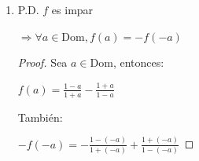 \documentclass{article}
\begin{document}
\begin{enumerate}
\begin{enumerate}
\begin{enumerate}
                \(\Rightarrow \neg(\forall a \in \text{Dom}, f(a) = f(-a))\)
                
                \(\Rightarrow \exists a \in \text{Dom}\) tal que \(f(a) \neq f(-a)\)
                
                \begin{proof} Sea \(a = 2\), entonces:
                
                \(f(a) = f(2)\)
                
                \(f(a) = \frac{{1-2}}{{1+2}} - \frac{{1+2}}{{1-2}}\)
                
                \(f(a) = -\frac{1}{3} + 3\)
                
                \(f(a) = \frac{8}{3}\)
                \vspace{\baselineskip}
                
                También:
                
                \(f(-a) = f(-2)\)
                
                \(f(-a) = \frac{{1-(-2)}}{{1+(-2)}} - \frac{{1+(-2)}}{{1-(-2)}}\)
                
                \(f(-a) = -3 + \frac{1}{3}\)
                
                \(f(-a) = -\frac{8}{3}\)
                \vspace{\baselineskip}
                
                Así, para alguna \(a\):
                
                \(f(a) \neq f(-a)\)
                \end{proof}
                
                \item[2.] P.D. \( f \) es impar
                
                \(\Rightarrow \forall a \in \text{Dom}, f(a) = -f(-a)\)
                
                \begin{proof} Sea \(a \in \text{Dom}\), entonces:
                
                \(f(a) = \frac{{1-a}}{{1+a}} - \frac{{1+a}}{{1-a}}\)
                \vspace{\baselineskip}
                
                También:
                
                \(-f(-a) = -\frac{{1-(-a)}}{{1+(-a)}} + \frac{{1+(-a)}}{{1-(-a)}}\)
                

\end{proof}
\end{enumerate}
\end{enumerate}
\end{enumerate}
\end{document}
